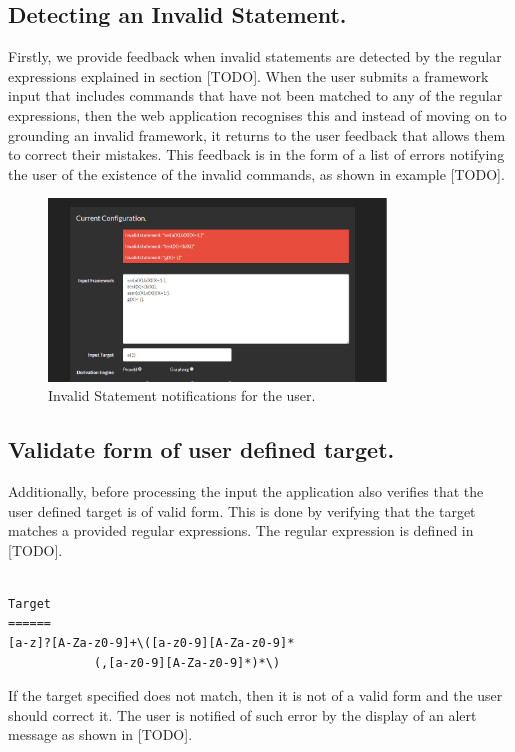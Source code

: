 \subsection{Detecting an Invalid Statement.}
Firstly, we provide feedback when invalid statements are detected by the regular expressions explained in section [TODO]. When the user submits a framework input that includes commands that have not been matched to any of the regular expressions, then the web application recognises this and instead of moving on to grounding an invalid framework, it returns to the user feedback that allows them to correct their mistakes. This feedback is in the form of a list of errors notifying the user of the existence of the invalid commands, as shown in example [TODO].

\begin{figure}[h]
    \centering
    \includegraphics[width=0.8\textwidth]{inputErrors.png}
    \caption{Invalid Statement notifications for the user.}
    \label{fig:invalid_stats}
\end{figure}

\subsection{Validate form of user defined target.}
Additionally, before processing the input the application also verifies that the user defined target is of valid form. This is done by verifying that the target matches a provided regular expressions. The regular expression is defined in [TODO].

\begin{Verbatim}[frame=single]

Target
======
[a-z]?[A-Za-z0-9]+\([a-z0-9][A-Za-z0-9]*
			(,[a-z0-9][A-Za-z0-9]*)*\)

\end{Verbatim}

If the target specified does not match, then it is not of a valid form and the user should correct it. The user is notified of such error by the display of an alert message as shown in [TODO].

